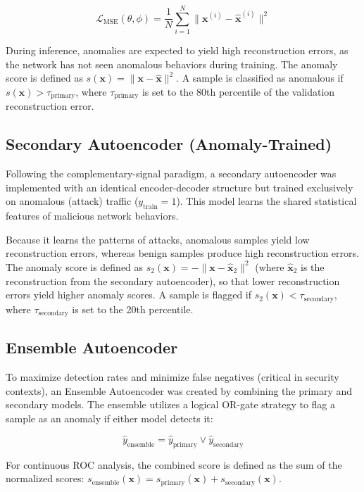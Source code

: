 \begin{equation}
  \mathcal{L}_{\text{MSE}}(\theta, \phi) = \frac{1}{N} \sum_{i=1}^N \|\mathbf{x}^{(i)} - \mathbf{\hat{x}}^{(i)}\|^2
\end{equation}

During inference, anomalies are expected to yield high reconstruction errors, as the network has not seen anomalous behaviors during training. The anomaly score is defined as $s(\mathbf{x}) = \|\mathbf{x} - \mathbf{\hat{x}}\|^2$. A sample is classified as anomalous if $s(\mathbf{x}) > \tau_{\text{primary}}$, where $\tau_{\text{primary}}$ is set to the 80th percentile of the validation reconstruction error.

\subsection{Secondary Autoencoder (Anomaly-Trained)}
Following the complementary-signal paradigm, a secondary autoencoder was implemented with an identical encoder-decoder structure but trained exclusively on anomalous (attack) traffic ($y_{\text{train}} = 1$). This model learns the shared statistical features of malicious network behaviors. 

Because it learns the patterns of attacks, anomalous samples yield low reconstruction errors, whereas benign samples produce high reconstruction errors. The anomaly score is defined as $s_2(\mathbf{x}) = -\|\mathbf{x} - \mathbf{\hat{x}}_2\|^2$ (where $\mathbf{\hat{x}}_2$ is the reconstruction from the secondary autoencoder), so that lower reconstruction errors yield higher anomaly scores. A sample is flagged if $s_2(\mathbf{x}) < \tau_{\text{secondary}}$, where $\tau_{\text{secondary}}$ is set to the 20th percentile.

\subsection{Ensemble Autoencoder}
To maximize detection rates and minimize false negatives (critical in security contexts), an Ensemble Autoencoder was created by combining the primary and secondary models. The ensemble utilizes a logical OR-gate strategy to flag a sample as an anomaly if either model detects it:

\begin{equation}
  \hat{y}_{\text{ensemble}} = \hat{y}_{\text{primary}} \lor \hat{y}_{\text{secondary}}
\end{equation}

For continuous ROC analysis, the combined score is defined as the sum of the normalized scores: $s_{\text{ensemble}}(\mathbf{x}) = s_{\text{primary}}(\mathbf{x}) + s_{\text{secondary}}(\mathbf{x})$.

